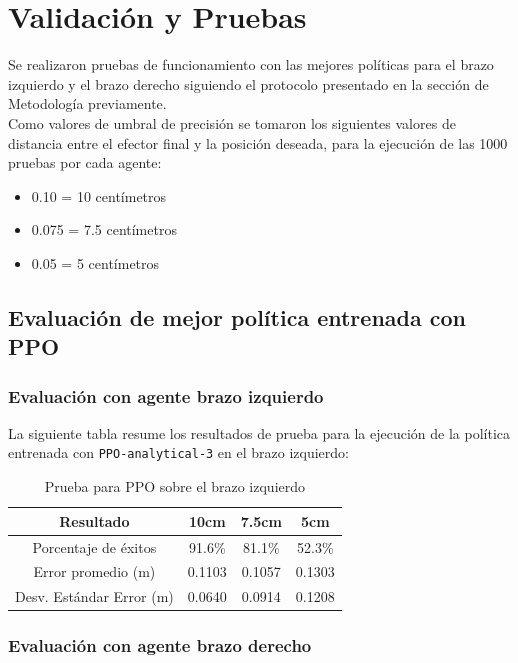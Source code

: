 \section{Validación y Pruebas}

Se realizaron pruebas de funcionamiento con las mejores políticas para el brazo izquierdo y el brazo derecho siguiendo el protocolo presentado en la sección de Metodología previamente. \\

Como valores de umbral de precisión se tomaron los siguientes valores de distancia entre el efector final y la posición deseada, para la ejecución de las 1000 pruebas por cada agente:

\begin{itemize}
	\item 0.10 = 10 centímetros
	\item 0.075 = 7.5 centímetros
	\item 0.05 = 5 centímetros
\end{itemize}

\subsection{Evaluación de mejor política entrenada con PPO}

\subsubsection{Evaluación con agente brazo izquierdo}

La siguiente tabla resume los resultados de prueba para la ejecución de la política entrenada con \texttt{PPO-analytical-3} en el brazo izquierdo:

\begin{table}[h!]
	\centering
	\caption{Prueba para PPO sobre el brazo izquierdo}
	\label{tab:best-ppo-left}
	\begin{tabular}{|c|c|c|c|}
		\hline
		\textbf{Resultado} & \textbf{10cm} & \textbf{7.5cm} & \textbf{5cm} \\
		\hline
		Porcentaje de éxitos & 91.6\% & 81.1\% & 52.3\% \\
		\hline
		Error promedio (m) & 0.1103 & 0.1057 & 0.1303 \\
		\hline
		Desv. Estándar Error (m) & 0.0640 & 0.0914 & 0.1208 \\
		\hline
	\end{tabular}
\end{table}

\subsubsection{Evaluación con agente brazo derecho}

